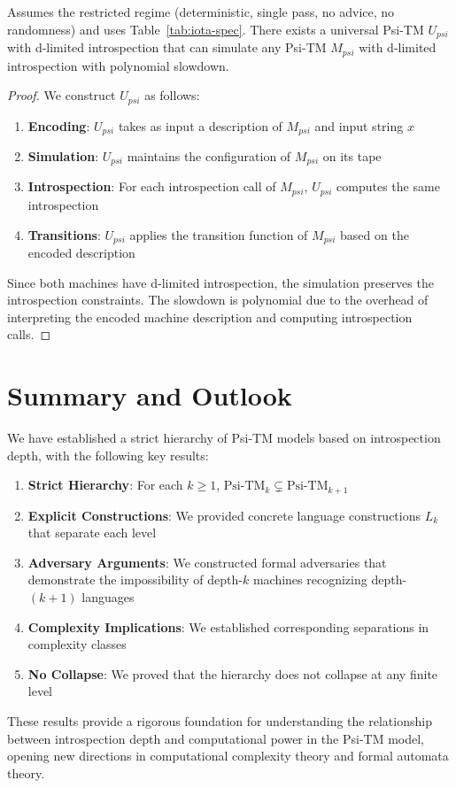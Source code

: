 \begin{theorem}
Assumes the restricted regime (deterministic, single pass, no advice, no randomness) and uses Table~\ref{tab:iota-spec}.
There exists a universal Psi-TM $U_{psi}$ with d-limited introspection that can simulate any Psi-TM $M_{psi}$ with d-limited introspection with polynomial slowdown.
\end{theorem}

\begin{proof}
We construct $U_{psi}$ as follows:

\begin{enumerate}
\item \textbf{Encoding}: $U_{psi}$ takes as input a description of $M_{psi}$ and input string $x$
\item \textbf{Simulation}: $U_{psi}$ maintains the configuration of $M_{psi}$ on its tape
\item \textbf{Introspection}: For each introspection call of $M_{psi}$, $U_{psi}$ computes the same introspection
\item \textbf{Transitions}: $U_{psi}$ applies the transition function of $M_{psi}$ based on the encoded description
\end{enumerate}

Since both machines have d-limited introspection, the simulation preserves the introspection constraints. The slowdown is polynomial due to the overhead of interpreting the encoded machine description and computing introspection calls.
\end{proof}

\section{Summary and Outlook}

We have established a strict hierarchy of Psi-TM models based on introspection depth, with the following key results:

\begin{enumerate}
\item \textbf{Strict Hierarchy}: For each $k \geq 1$, $\text{Psi-TM}_k \subsetneq \text{Psi-TM}_{k+1}$
\item \textbf{Explicit Constructions}: We provided concrete language constructions $L_k$ that separate each level
\item \textbf{Adversary Arguments}: We constructed formal adversaries that demonstrate the impossibility of depth-$k$ machines recognizing depth-$(k+1)$ languages
\item \textbf{Complexity Implications}: We established corresponding separations in complexity classes
\item \textbf{No Collapse}: We proved that the hierarchy does not collapse at any finite level
\end{enumerate}

These results provide a rigorous foundation for understanding the relationship between introspection depth and computational power in the Psi-TM model, opening new directions in computational complexity theory and formal automata theory.

